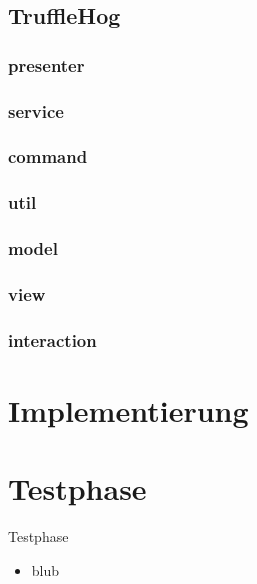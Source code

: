 \documentclass[18pt]{beamer}
\begin{document}
\subsection{TruffleHog}
	
	\subsubsection{presenter}
		
	\subsubsection{service}
		
	\subsubsection{command}
		
	\subsubsection{util}
		
	\subsubsection{model}
		
	\subsubsection{view}
		
	\subsubsection{interaction}
		
\fi


\section{Implementierung}
    
    

\section{Testphase}
    \begin{frame}{Testphase}
        \begin{itemize}
          \item blub
        \end{itemize}
    \end{frame}
    
\end{document}
